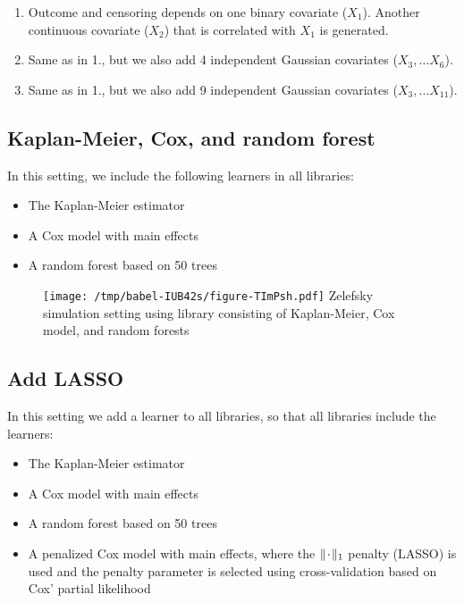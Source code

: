 \documentclass[a4paper,danish]{article}
\begin{document}
\begin{enumerate}
\item Outcome and censoring depends on one binary covariate (\(X_1\)). Another
continuous covariate (\(X_2\)) that is correlated with \(X_1\) is generated.
\item Same as in 1., but we also add 4 independent Gaussian covariates (\(X_3,
   \dots X_6\)).
\item Same as in 1., but we also add 9 independent Gaussian covariates (\(X_3,
   \dots X_{11}\)).
\end{enumerate}

\subsection{Kaplan-Meier, Cox, and random forest}
\label{sec:org7f2bb4f}
In this setting, we include the following learners in all libraries:

\begin{itemize}
\item The Kaplan-Meier estimator
\item A Cox model with main effects
\item A random forest based on 50 trees
\end{itemize}

\begin{figure}[htbp]
\centering
\texttt{[image: /tmp/babel-IUB42s/figure-TImPsh.pdf]}
Zelefsky simulation setting using library consisting of Kaplan-Meier, Cox model, and random forests
\end{figure}

\clearpage

\subsection{Add LASSO}
\label{sec:orgf3d57c9}
In this setting we add a learner to all libraries, so that all libraries include
the learners:

\begin{itemize}
\item The Kaplan-Meier estimator
\item A Cox model with main effects
\item A random forest based on 50 trees
\item A penalized Cox model with main effects, where the \(\|\blank\|_1\) penalty
(LASSO) is used and the penalty parameter is selected using cross-validation
based on Cox' partial likelihood
\end{itemize}
\end{document}
